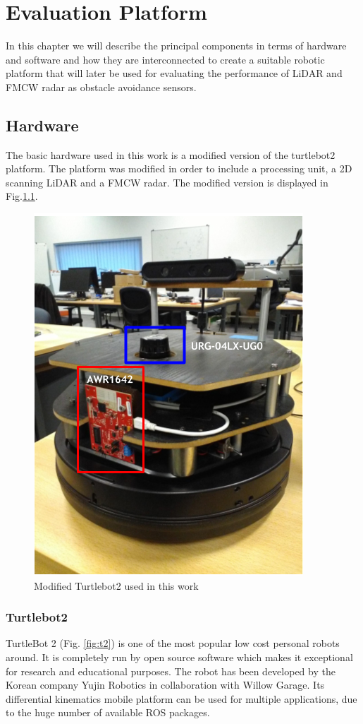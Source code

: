 \chapter{Evaluation Platform}

In this  chapter we will describe the principal components in terms of hardware and software and how they are interconnected to create a suitable robotic platform that will later be used for evaluating the performance of \ac{LiDAR} and \ac{FMCW} \ac{radar} as obstacle avoidance sensors.


\section{Hardware}
The basic hardware used in this work is a  modified version of the  turtlebot2 platform.
The platform was modified in order to include a processing unit, a 2D scanning \ac{LiDAR} and a \ac{FMCW} radar. The modified version is displayed in Fig.\ref{fig::turlebot2M}. 

\begin{figure}[ht!] 
\centerline{\includegraphics [width=0.4 \textwidth]{imgs/chapter4/turtlebot2.PNG}}
\caption{Modified Turtlebot2 used in this work}
\label{fig::turlebot2M}
\end{figure}

\subsection{Turtlebot2}
TurtleBot 2 (Fig. \ref{fig:t2}) is one of the  most popular low cost personal robots around. It is completely run by open source software which makes it exceptional for research and educational purposes. The robot has been developed by the Korean company Yujin Robotics in collaboration with Willow Garage. Its differential kinematics mobile platform can be used for multiple applications, due to the huge number of available ROS packages. 

